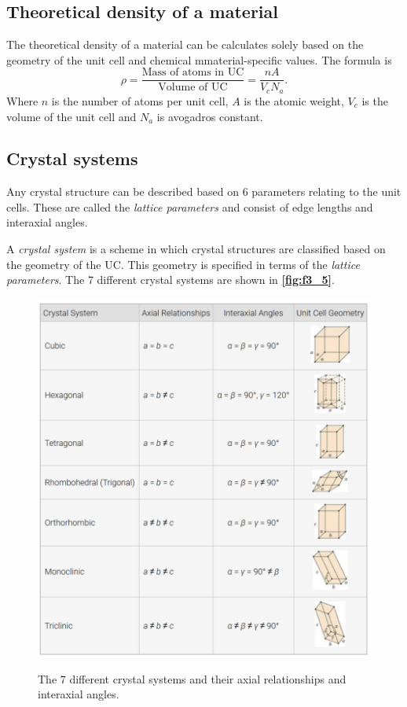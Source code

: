 \subsection{Theoretical density of a material}
The theoretical density of a material can be calculates solely based on the geometry of the unit cell and chemical mmaterial-specific values. The formula is
\[ 
\rho = \frac{\text{Mass of atoms in UC}}{\text{Volume of UC}} = \frac{nA}{V_c N_a}
.\]
Where $n$ is the number of atoms per unit cell, $A$ is the atomic weight, $V_c$ is the volume of the unit cell and $N_a$ is avogadros constant.

\subsection{Crystal systems}
Any crystal structure can be described based on 6 parameters relating to the unit cells. These are called the \textit{lattice parameters} and consist of edge lengths and interaxial angles. 

\begin{definition}
  A \textit{crystal system} is a scheme in which crystal structures are classified based on the geometry of the UC. This geometry is specified in terms of the \textit{lattice parameters}. The 7 different crystal systems are shown in \textbf{\autoref{fig:f3_5}}.
\end{definition}
\begin{figure} [ht]
  \centering
  \caption{The 7 different crystal systems and their axial relationships and interaxial angles.}
  \includegraphics[width=0.5\linewidth]{./figures/f3_5.png}
  \label{fig:f3_5}
\end{figure}

